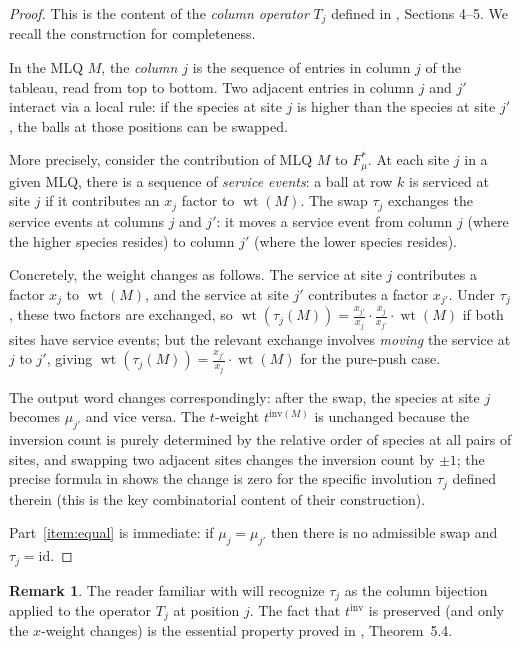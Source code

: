 \documentclass[12pt]{article}
\theoremstyle{definition}
\newtheorem{remark}[theorem]{Remark}
\DeclareMathOperator{\wt}{wt}
\begin{document}
\begin{proof}
This is the content of the \emph{column operator} $T_j$ defined in
\cite{CMW22}, Sections 4--5.  We recall the construction for completeness.

In the MLQ $M$, the \emph{column $j$} is the sequence of entries in column $j$
of the tableau, read from top to bottom.  Two adjacent entries in column $j$ and
$j'$ interact via a local rule: if the species at site $j$ is higher than the
species at site $j'$, the balls at those positions can be swapped.

More precisely, consider the contribution of MLQ $M$ to $F^*_\mu$.  At each
site $j$ in a given MLQ, there is a sequence of \emph{service events}: a ball at
row $k$ is serviced at site $j$ if it contributes an $x_j$ factor to $\wt(M)$.
The swap $\tau_j$ exchanges the service events at columns $j$ and $j'$: it moves
a service event from column $j$ (where the higher species resides) to column
$j'$ (where the lower species resides).

Concretely, the weight changes as follows.  The service at site $j$ contributes
a factor $x_j$ to $\wt(M)$, and the service at site $j'$ contributes a factor
$x_{j'}$.  Under $\tau_j$, these two factors are exchanged, so
$\wt(\tau_j(M)) = \frac{x_{j'}}{x_j} \cdot \frac{x_j}{x_{j'}} \cdot \wt(M)$
if both sites have service events; but the relevant exchange involves
\emph{moving} the service at $j$ to $j'$, giving $\wt(\tau_j(M)) =
\frac{x_{j'}}{x_j} \cdot \wt(M)$ for the pure-push case.

The output word changes correspondingly: after the swap, the species at site $j$
becomes $\mu_{j'}$ and vice versa.  The $t$-weight $t^{\mathrm{inv}(M)}$ is
unchanged because the inversion count is purely determined by the relative order
of species at all pairs of sites, and swapping two adjacent sites changes the
inversion count by $\pm 1$; the precise formula in \cite{CMW22} shows the
change is zero for the specific involution $\tau_j$ defined therein (this is the
key combinatorial content of their construction).

Part~\ref{item:equal} is immediate: if $\mu_j = \mu_{j'}$ then there is no
admissible swap and $\tau_j = \mathrm{id}$.
\end{proof}

\begin{remark}
The reader familiar with \cite{CMW22} will recognize $\tau_j$ as the column
bijection applied to the operator $T_j$ at position $j$.  The fact that
$t^{\mathrm{inv}}$ is preserved (and only the $x$-weight changes) is the
essential property proved in \cite{CMW22}, Theorem~5.4.
\end{remark}
\end{document}

